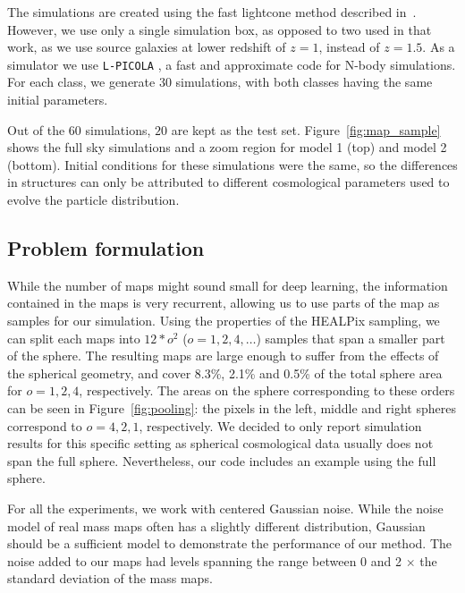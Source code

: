 \documentclass[final,twocolumn,3p,times,authoryear]{elsarticle}
\newcommand{\figref}[1]{Figure~\ref{fig:#1}}
\newcommand{\1}{\b{1}}              %
\newcommand{\0}{\b{0}}              %
\newcommand{\pkg}[1]{\texttt{#1}}
\begin{document}
The simulations are created using the fast lightcone method described in~\citep{sgier2018fastgeneration}.
However, we use only a single simulation box, as opposed to two used in that work, as we use source galaxies at lower redshift of $z=1$, instead of $z=1.5$.
As a simulator we use \pkg{L-PICOLA} \citep{howlett2015lpicola}, a fast and approximate code for N-body simulations.
For each class, we generate $30$ simulations, with both classes having the same initial parameters.

Out of the $60$ simulations, $20$ are kept as the test set.
\figref{map_sample} shows the full sky simulations and a zoom region for model 1 (top) and model 2 (bottom).
Initial conditions for these simulations were the same, so the differences in structures can only be attributed to different cosmological parameters used to evolve the particle distribution.



\subsection{Problem formulation}
While the number of maps might sound small for deep learning, the information contained in the maps is very recurrent, allowing us to use parts of the map as samples for our simulation.
Using the properties of the HEALPix sampling, we can split each maps into $12*o^2$ ($o=1,2,4,\dots$) samples that span a smaller part of the sphere.
The resulting maps are large enough to suffer from the effects of the spherical geometry, and cover 8.3\%, 2.1\% and 0.5\% of the total sphere area for $o=1,2,4$, respectively.
The areas on the sphere corresponding to these orders can be seen in \figref{pooling}: the pixels in the left, middle and right spheres correspond to $o=4,2,1$, respectively.
We decided to only report simulation results for this specific setting as spherical cosmological data usually does not span the full sphere.
Nevertheless, our code includes an example using the full sphere.

For all the experiments, we work with centered Gaussian noise.
While the noise model of real mass maps often has a slightly different distribution, Gaussian should be a sufficient model to demonstrate the performance of our method.
The noise added to our maps had levels spanning the range between 0 and 2  $\times$ the standard deviation of the mass maps.
\end{document}
